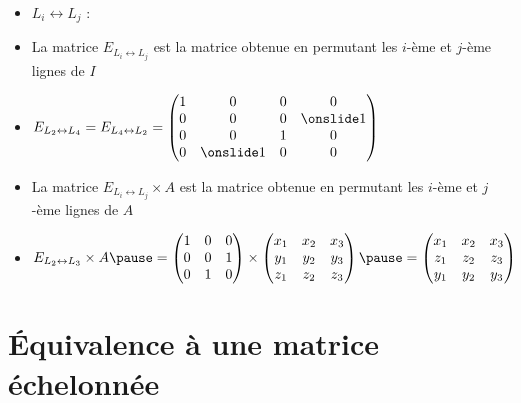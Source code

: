 \begin{frame}
\begin{itemize}\setlength{\itemsep}{8pt}
  \item $L_i \leftrightarrow L_j$ : 
\pause 
  \item La matrice  $E_{L_i \leftrightarrow L_j}$ est la matrice obtenue 
   en permutant les $i$-ème et $j$-ème lignes de $I$
\pause
  \item $ E_{L_2 \leftrightarrow L_4} = E_{L_4 \leftrightarrow L_2} = 
   \begin{pmatrix}
    1 & 0 & 0 & 0\\
    0 & 0 & 0 & \mathinsist{1}\\
    0 & 0 & 1 & 0\\
    0 & \mathinsist{1} & 0 & 0
    \end{pmatrix}$  
\pause
  \item La matrice  $E_{L_i \leftrightarrow L_j} \times A$ est la matrice obtenue 
   en permutant les $i$-ème et $j$-ème lignes de $A$
\pause   
   
  \item $E_{L_2 \leftrightarrow L_3}  \times A
  \pause
= \begin{pmatrix}
  1&0&0\\0&0&1\\0&1&0  
  \end{pmatrix}
  \times
  \begin{pmatrix}
  x_1&x_2&x_3\\y_1&y_2&y_3\\z_1&z_2&z_3  
  \end{pmatrix}
  \pause
  =   \begin{pmatrix}
  x_1&x_2&x_3\\z_1&z_2&z_3\\ y_1&y_2&y_3  
  \end{pmatrix}
$ 
\end{itemize}

\end{frame}


\section{\'Equivalence à une matrice échelonnée}

